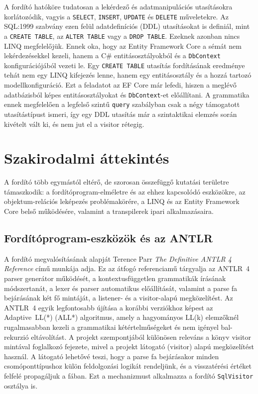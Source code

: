 \documentclass[a4paper,12pt]{article}
\begin{document}
A fordító hatóköre tudatosan a lekérdező és adatmanipulációs utasításokra korlátozódik, vagyis a \texttt{SELECT}, \texttt{INSERT}, \texttt{UPDATE} és \texttt{DELETE} műveletekre. Az SQL:1999 szabvány ezen felül adatdefiníciós (DDL) utasításokat is definiál, mint a \texttt{CREATE TABLE}, az \texttt{ALTER TABLE} vagy a \texttt{DROP TABLE}. Ezeknek azonban nincs LINQ megfelelőjük. Ennek oka, hogy az Entity Framework Core a sémát nem lekérdezésekkel kezeli, hanem a C\# entitásosztályokból és a \texttt{DbContext} konfigurációjából vezeti le. Egy \texttt{CREATE TABLE} utasítás fordításának eredménye tehát nem egy LINQ kifejezés lenne, hanem egy entitásosztály és a hozzá tartozó modellkonfiguráció. Ezt a feladatot az EF Core már lefedi, hiszen a meglévő adatbázisból képes entitásosztályokat és \texttt{DbContext}-et előállítani. A grammatika ennek megfelelően a legfelső szintű \texttt{query} szabályban csak a négy támogatott utasítástípust ismeri, így egy DDL utasítás már a szintaktikai elemzés során kivételt vált ki, és nem jut el a visitor rétegig.

\section{Szakirodalmi áttekintés}

A fordító több egymástól eltérő, de szorosan összefüggő kutatási területre támaszkodik: a fordítóprogram-elméletre és az ehhez kapcsolódó eszközökre, az objektum-relációs leképezés problémakörére, a LINQ és az Entity Framework Core belső működésére, valamint a transpilerek ipari alkalmazásaira.

\subsection{Fordítóprogram-eszközök és az ANTLR}

A fordító megvalósításának alapját Terence Parr \textit{The Definitive ANTLR 4 Reference} \cite{parr2013antlr4} című munkája adja. Ez az átfogó referenciamű tárgyalja az ANTLR~4 parser generátor működését, a kontextusfüggetlen grammatikák írásának módszertanát, a lexer és parser automatikus előállítását, valamint a parse fa bejárásának két fő mintáját, a listener- és a visitor-alapú megközelítést. Az ANTLR~4 egyik legfontosabb újítása a korábbi verziókhoz képest az Adaptive~LL(*) (ALL*) algoritmus, amely a hagyományos LL(k) elemzőknél rugalmasabban kezeli a grammatikai kétértelműségeket és nem igényel bal-rekurzió eltávolítást. A projekt szempontjából különösen releváns a könyv visitor mintával foglalkozó fejezete, mivel a projekt látogató (visitor) alapú megközelítést használ. A látogató lehetővé teszi, hogy a parse fa bejárásakor minden csomóponttípushoz külön feldolgozási logikát rendeljünk, és a visszatérési értéket felfelé propagáljuk a fában. Ezt a mechanizmust alkalmazza a fordító \texttt{SqlVisitor} osztálya is.
\end{document}
